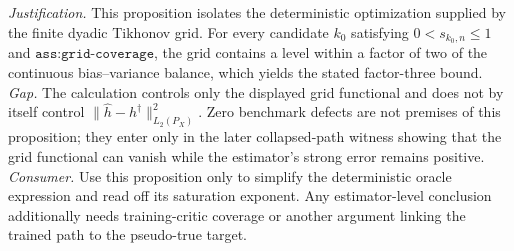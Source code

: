 \documentclass{article}
\begin{document}
\par\smallskip\noindent \textit{Justification.} This proposition isolates the deterministic optimization supplied by the finite dyadic Tikhonov grid. For every candidate \(k_0\) satisfying \(0<s_{k_0,n}\le1\) and \(\texttt{ass:grid-coverage}\), the grid contains a level within a factor of two of the continuous bias--variance balance, which yields the stated factor-three bound. \textit{Gap.} The calculation controls only the displayed grid functional and does not by itself control \(\|\widehat h-h^\dagger\|_{L_2(P_X)}^2\). Zero benchmark defects are not premises of this proposition; they enter only in the later collapsed-path witness showing that the grid functional can vanish while the estimator's strong error remains positive. \textit{Consumer.} Use this proposition only to simplify the deterministic oracle expression and read off its saturation exponent. Any estimator-level conclusion additionally needs training-critic coverage or another argument linking the trained path to the pseudo-true target.
\end{document}
